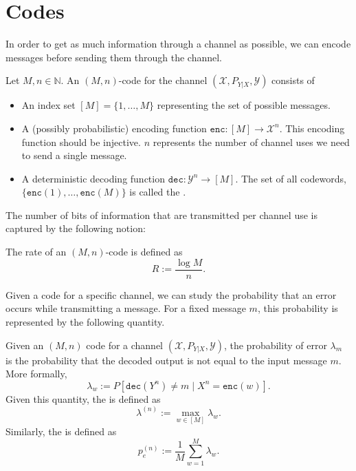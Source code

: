 \section{Codes}
In order to get as much information through a channel as possible, we can encode messages before sending them through the channel.

\begin{definition}[Code]\label{def:code}
Let $M, n \in \mathbb{N}$. An $(M,n)$-code for the channel $(\mathcal{X},P_{Y|X},\mathcal{Y})$ consists of
\begin{itemize}
\item An index set $[M] = \{1, \ldots, M\}$ representing the set of possible messages.
\item A (possibly probabilistic) encoding function $\mathtt{enc} :[M] \to \mathcal{X}^n$. This encoding function should be injective. $n$ represents the number of channel uses we need to send a single message.
\item A deterministic decoding function $\mathtt{dec} : \mathcal{Y}^n \to [M]$.
The set of all codewords, $\{\mathtt{enc}(1), \ldots, \mathtt{enc}(M)\}$ is called the .
\end{itemize}
\end{definition}

\noindent The number of bits of information that are transmitted per channel use is captured by the following notion:

\begin{definition}[Rate]
The rate of an $(M,n)$-code is defined as
\[
R := \frac{\log M}{n}.
\]
\end{definition}

Given a code for a specific channel, we can study the probability that an error occurs while transmitting a message. For a fixed message $m$, this probability is represented by the following quantity.

\begin{definition}\label{def:probability-of-error}
Given an $(M,n)$ code for a channel $(\mathcal{X},P_{Y|X},\mathcal{Y})$, the probability of error $\lambda_m$ is the probability that the decoded output is not equal to the input message $m$. More formally,
\[
\lambda_w := P[\mathtt{dec}(Y^n) \neq m \mid X^n = \mathtt{enc}(w)].
\]
Given this quantity, the  is defined as 
\[\lambda^{(n)} := \max_{w \in [M]} \lambda_w.\]
Similarly, the  is defined as
\[
p_e^{(n)} := \frac{1}{M} \sum_{w=1}^M \lambda_w.
\]
\end{definition}

